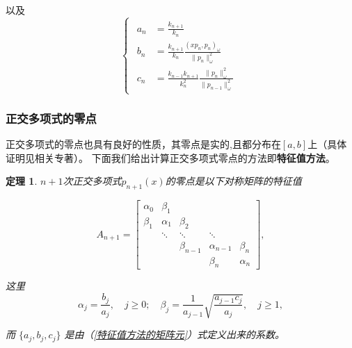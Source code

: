 \documentclass[12pt]{ctexart}
\numberwithin{equation}{section} %
\newtheorem{theorem}{定理}[section]
\begin{document}
以及
\begin{equation}
    \begin{cases}
        \begin{aligned}
            a_{n} &= \frac{k_{n+1}}{k_{n}} \\
            b_{n} &= \frac{k_{n+1}}{k_{n}} \frac{(xp_{n}, p_{n})_\omega}{\|p_{n}\|_{\omega}^{2}} \\
            c_n &= \frac{k_{n-1}k_{n+1}}{k_n^2} \frac{\|p_n\|_{\omega}^2}{\|p_{n-1}\|_{\omega}^2}
        \end{aligned}
        \label{特征值方法的矩阵元}
    \end{cases}
\end{equation}
\subsubsection{正交多项式的零点}
正交多项式的零点也具有良好的性质，其零点是实的,且都分布在$[a,b]$上（具体证明见相关专著）。
下面我们给出计算正交多项式零点的方法即\textbf{特征值方法}。

\begin{theorem}
$n+1$次正交多项式$p_{n+1}(x)$的零点是以下对称矩阵的特征值

\begin{equation}
    A_{n+1}=\begin{bmatrix}\alpha_0&\beta_1\\\beta_1&\alpha_1&\beta_2\\&\ddots&\ddots&\ddots\\&&\beta_{n-1}&\alpha_{n-1}&\beta_n\\&&&\beta_n&\alpha_n\end{bmatrix},
\label{eq:零点矩阵}
\end{equation}
    
这里
$$\alpha_j=\frac{b_j}{a_j},\quad j\ge0;\quad\beta_j=\frac{1}{a_{j-1}}\sqrt{\frac{a_{j-1}c_j}{a_j}},\quad j\ge1,$$



而 $\{ a_{j}, b_{j}, c_{j}\}$ 是由（\ref{特征值方法的矩阵元}）式定义出来的系数。
\label{theorem:零点矩阵}
\end{theorem}
\end{document}
